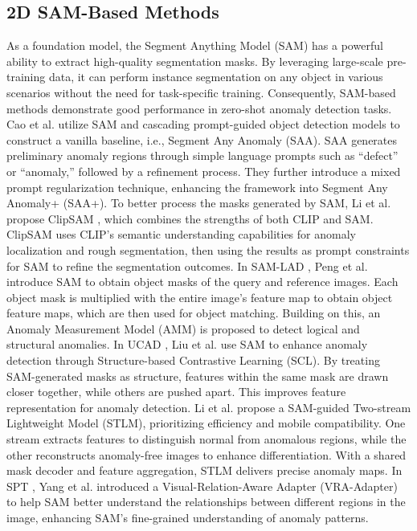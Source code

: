 \documentclass[journal,comsoc]{IEEEtran}
\begin{document}
\subsection{2D SAM-Based Methods}
As a foundation model, the Segment Anything Model (SAM) \cite{kirillov2023sam,cao2023collaborative,wan2021industrial} has a powerful ability to extract high-quality segmentation masks. By leveraging large-scale pre-training data, it can perform instance segmentation on any object in various scenarios without the need for task-specific training. Consequently, SAM-based methods demonstrate good performance in zero-shot anomaly detection tasks. Cao et al. \cite{cao2023segment} utilize SAM and cascading prompt-guided object detection models \cite{liu2025grounding} to construct a vanilla baseline, i.e., Segment Any Anomaly (SAA). SAA generates preliminary anomaly regions through simple language prompts such as “defect” or “anomaly,” followed by a refinement process. They further introduce a mixed prompt regularization technique, enhancing the framework into Segment Any Anomaly+ (SAA+). To better process the masks generated by SAM, Li et al. propose ClipSAM \cite{li2024clipsam}, which combines the strengths of both CLIP and SAM. ClipSAM uses CLIP’s semantic understanding capabilities for anomaly localization and rough segmentation, then using the results as prompt constraints for SAM to refine the segmentation outcomes. In SAM-LAD \cite{peng2024sam}, Peng et al. introduce SAM to obtain object masks of the query and reference images. Each object mask is multiplied with the entire image’s feature map to obtain object feature maps, which are then used for object matching. Building on this, an Anomaly Measurement Model (AMM) is proposed to detect logical and structural anomalies. In UCAD \cite{liu2024unsupervised}, Liu et al. use SAM to enhance anomaly detection through Structure-based Contrastive Learning (SCL). By treating SAM-generated masks as structure, features within the same mask are drawn closer together, while others are pushed apart. This improves feature representation for anomaly detection. Li et al. \cite{li2024sam} propose a SAM-guided Two-stream Lightweight Model (STLM), prioritizing efficiency and mobile compatibility. One stream extracts features to distinguish normal from anomalous regions, while the other reconstructs anomaly-free images to enhance differentiation. With a shared mask decoder and feature aggregation, STLM delivers precise anomaly maps. In SPT \cite{yang2024spt}, Yang et al. introduced a Visual-Relation-Aware Adapter (VRA-Adapter) to help SAM better understand the relationships between different regions in the image, enhancing SAM's fine-grained understanding of anomaly patterns.
\end{document}
